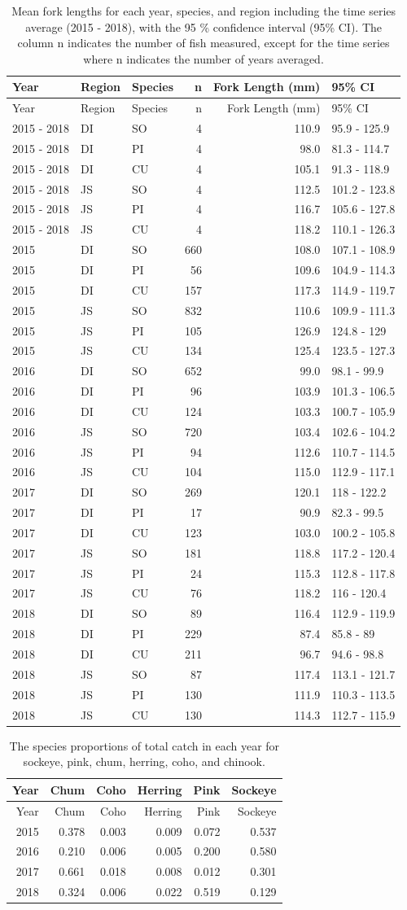 \documentclass[fleqn,10pt]{wlpeerj} %
\begin{document}
\begin{longtable}[]{@{}lllrrl@{}}
\caption{\label{tab:length} Mean fork lengths for each year, species, and
region including the time series average (2015 - 2018), with the 95 \%
confidence interval (95\% CI). The column n indicates the number of fish
measured, except for the time series where n indicates the number of
years averaged.}\tabularnewline
\toprule
Year & Region & Species & n & Fork Length (mm) & 95\% CI\tabularnewline
\midrule
\endfirsthead
\toprule
Year & Region & Species & n & Fork Length (mm) & 95\% CI\tabularnewline
\midrule
\endhead
2015 - 2018 & DI & SO & 4 & 110.9 & 95.9 - 125.9\tabularnewline
2015 - 2018 & DI & PI & 4 & 98.0 & 81.3 - 114.7\tabularnewline
2015 - 2018 & DI & CU & 4 & 105.1 & 91.3 - 118.9\tabularnewline
2015 - 2018 & JS & SO & 4 & 112.5 & 101.2 - 123.8\tabularnewline
2015 - 2018 & JS & PI & 4 & 116.7 & 105.6 - 127.8\tabularnewline
2015 - 2018 & JS & CU & 4 & 118.2 & 110.1 - 126.3\tabularnewline
2015 & DI & SO & 660 & 108.0 & 107.1 - 108.9\tabularnewline
2015 & DI & PI & 56 & 109.6 & 104.9 - 114.3\tabularnewline
2015 & DI & CU & 157 & 117.3 & 114.9 - 119.7\tabularnewline
2015 & JS & SO & 832 & 110.6 & 109.9 - 111.3\tabularnewline
2015 & JS & PI & 105 & 126.9 & 124.8 - 129\tabularnewline
2015 & JS & CU & 134 & 125.4 & 123.5 - 127.3\tabularnewline
2016 & DI & SO & 652 & 99.0 & 98.1 - 99.9\tabularnewline
2016 & DI & PI & 96 & 103.9 & 101.3 - 106.5\tabularnewline
2016 & DI & CU & 124 & 103.3 & 100.7 - 105.9\tabularnewline
2016 & JS & SO & 720 & 103.4 & 102.6 - 104.2\tabularnewline
2016 & JS & PI & 94 & 112.6 & 110.7 - 114.5\tabularnewline
2016 & JS & CU & 104 & 115.0 & 112.9 - 117.1\tabularnewline
2017 & DI & SO & 269 & 120.1 & 118 - 122.2\tabularnewline
2017 & DI & PI & 17 & 90.9 & 82.3 - 99.5\tabularnewline
2017 & DI & CU & 123 & 103.0 & 100.2 - 105.8\tabularnewline
2017 & JS & SO & 181 & 118.8 & 117.2 - 120.4\tabularnewline
2017 & JS & PI & 24 & 115.3 & 112.8 - 117.8\tabularnewline
2017 & JS & CU & 76 & 118.2 & 116 - 120.4\tabularnewline
2018 & DI & SO & 89 & 116.4 & 112.9 - 119.9\tabularnewline
2018 & DI & PI & 229 & 87.4 & 85.8 - 89\tabularnewline
2018 & DI & CU & 211 & 96.7 & 94.6 - 98.8\tabularnewline
2018 & JS & SO & 87 & 117.4 & 113.1 - 121.7\tabularnewline
2018 & JS & PI & 130 & 111.9 & 110.3 - 113.5\tabularnewline
2018 & JS & CU & 130 & 114.3 & 112.7 - 115.9\tabularnewline
\bottomrule
\end{longtable}

\begin{longtable}[]{@{}rrrrrr@{}}
\caption{\label{tab:proptable} The species proportions of total catch in
each year for sockeye, pink, chum, herring, coho, and
chinook.}\tabularnewline
\toprule
Year & Chum & Coho & Herring & Pink & Sockeye\tabularnewline
\midrule
\endfirsthead
\toprule
Year & Chum & Coho & Herring & Pink & Sockeye\tabularnewline
\midrule
\endhead
2015 & 0.378 & 0.003 & 0.009 & 0.072 & 0.537\tabularnewline
2016 & 0.210 & 0.006 & 0.005 & 0.200 & 0.580\tabularnewline
2017 & 0.661 & 0.018 & 0.008 & 0.012 & 0.301\tabularnewline
2018 & 0.324 & 0.006 & 0.022 & 0.519 & 0.129\tabularnewline
\bottomrule
\end{longtable}
\end{document}
